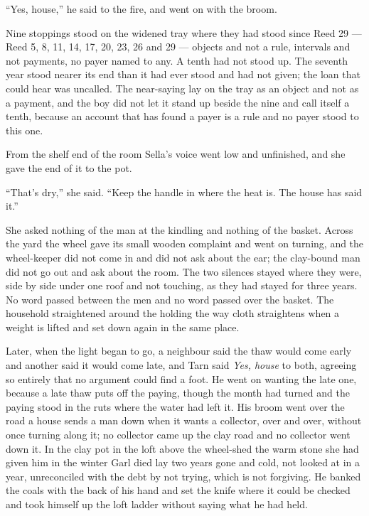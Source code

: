 “Yes, house,” he said to the fire, and went on with the broom.

Nine stoppings stood on the widened tray where they had stood since Reed 29 --- Reed 5, 8, 11, 14, 17, 20, 23, 26 and 29 --- objects and not a rule, intervals and not payments, no payer named to any. A tenth had not stood up. The seventh year stood nearer its end than it had ever stood and had not given; the loan that could hear was uncalled. The near-saying lay on the tray as an object and not as a payment, and the boy did not let it stand up beside the nine and call itself a tenth, because an account that has found a payer is a rule and no payer stood to this one.

From the shelf end of the room Sella's voice went low and unfinished, and she gave the end of it to the pot.

“That's dry,” she said. “Keep the handle in where the heat is. The house has said it.”

She asked nothing of the man at the kindling and nothing of the basket. Across the yard the wheel gave its small wooden complaint and went on turning, and the wheel-keeper did not come in and did not ask about the ear; the clay-bound man did not go out and ask about the room. The two silences stayed where they were, side by side under one roof and not touching, as they had stayed for three years. No word passed between the men and no word passed over the basket. The household straightened around the holding the way cloth straightens when a weight is lifted and set down again in the same place.

\scenebreak

Later, when the light began to go, a neighbour said the thaw would come early and another said it would come late, and Tarn said \emph{Yes, house} to both, agreeing so entirely that no argument could find a foot. He went on wanting the late one, because a late thaw puts off the paying, though the month had turned and the paying stood in the ruts where the water had left it. His broom went over the road a house sends a man down when it wants a collector, over and over, without once turning along it; no collector came up the clay road and no collector went down it. In the clay pot in the loft above the wheel-shed the warm stone she had given him in the winter Garl died lay two years gone and cold, not looked at in a year, unreconciled with the debt by not trying, which is not forgiving. He banked the coals with the back of his hand and set the knife where it could be checked and took himself up the loft ladder without saying what he had held.

